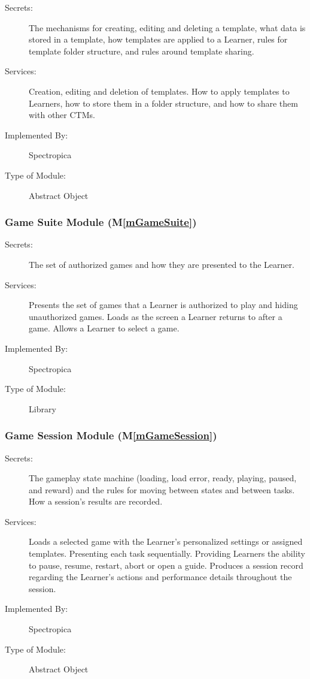\documentclass[12pt, titlepage]{article}
\newcommand{\mref}[1]{M\ref{#1}}
\begin{document}
\begin{description}
\item[Secrets:] The mechanisms for creating, editing and deleting a template, what data is stored in a template, how templates are applied to a Learner, rules for template folder structure, and rules around template sharing.
\item[Services:] Creation, editing and deletion of templates. How to apply templates to Learners, how to store them in a folder structure, and how to share them with other CTMs.
\item[Implemented By:] Spectropica
\item[Type of Module:] Abstract Object
\end{description}

\subsubsection{Game Suite Module (\mref{mGameSuite})}

\begin{description}
\item[Secrets:] The set of authorized games and how they are presented to the Learner.
\item[Services:] Presents the set of games that a Learner is authorized to play and hiding unauthorized games. Loads as the screen a Learner returns to after a game. Allows a Learner to select a game.
\item[Implemented By:] Spectropica
\item[Type of Module:] Library
\end{description}

\subsubsection{Game Session Module (\mref{mGameSession})}

\begin{description}
\item[Secrets:] 
The gameplay state machine (loading, load error, ready,
  playing, paused, and reward) and the rules for moving between states and between tasks. How a session's results are recorded.

\item[Services:] 
Loads a selected game with the Learner's personalized settings or assigned templates. Presenting each task sequentially. Providing Learners the ability to pause, resume, restart, abort or open a guide. Produces a session record regarding the Learner's actions and performance details throughout the session.
\item[Implemented By:] Spectropica
\item[Type of Module:] Abstract Object
\end{description}
\end{document}
